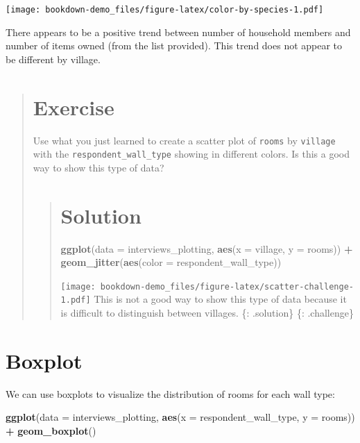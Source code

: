 \documentclass[]{book}
\newenvironment{Shaded}{\begin{snugshade}}{\end{snugshade}}
\newcommand{\KeywordTok}[1]{\textcolor[rgb]{0.13,0.29,0.53}{\textbf{#1}}}
\newcommand{\DataTypeTok}[1]{\textcolor[rgb]{0.13,0.29,0.53}{#1}}
\newcommand{\StringTok}[1]{\textcolor[rgb]{0.31,0.60,0.02}{#1}}
\newcommand{\OperatorTok}[1]{\textcolor[rgb]{0.81,0.36,0.00}{\textbf{#1}}}
\newcommand{\NormalTok}[1]{#1}
\begin{document}
\texttt{[image: bookdown-demo\_files/figure-latex/color-by-species-1.pdf]}

There appears to be a positive trend between number of household members
and number of items owned (from the list provided). This trend does not
appear to be different by village.

\begin{quote}
\section{Exercise}\label{exercise-12}

Use what you just learned to create a scatter plot of \texttt{rooms} by
\texttt{village} with the \texttt{respondent\_wall\_type} showing in
different colors. Is this a good way to show this type of data?

\begin{quote}
\section{Solution}\label{solution-16}

\begin{Shaded}
\begin{Highlighting}[]
\KeywordTok{ggplot}\NormalTok{(}\DataTypeTok{data =}\NormalTok{ interviews_plotting, }\KeywordTok{aes}\NormalTok{(}\DataTypeTok{x =}\NormalTok{ village, }\DataTypeTok{y =}\NormalTok{ rooms)) }\OperatorTok{+}
\KeywordTok{geom_jitter}\NormalTok{(}\KeywordTok{aes}\NormalTok{(}\DataTypeTok{color =}\NormalTok{ respondent_wall_type))}
\end{Highlighting}
\end{Shaded}

\texttt{[image: bookdown-demo\_files/figure-latex/scatter-challenge-1.pdf]}
This is not a good way to show this type of data because it is difficult
to distinguish between villages. \{: .solution\} \{: .challenge\}
\end{quote}
\end{quote}

\section{Boxplot}\label{boxplot}

We can use boxplots to visualize the distribution of rooms for each wall
type:

\begin{Shaded}
\begin{Highlighting}[]
\KeywordTok{ggplot}\NormalTok{(}\DataTypeTok{data =}\NormalTok{ interviews_plotting, }\KeywordTok{aes}\NormalTok{(}\DataTypeTok{x =}\NormalTok{ respondent_wall_type, }\DataTypeTok{y =}\NormalTok{ rooms)) }\OperatorTok{+}
\StringTok{    }\KeywordTok{geom_boxplot}\NormalTok{()}
\end{Highlighting}
\end{Shaded}
\end{document}

